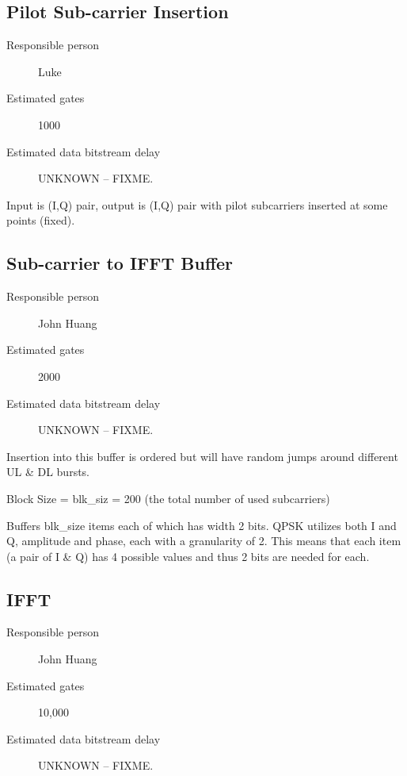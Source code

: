 \documentclass[dvips,10pt,twocolumn]{article}
\begin{document}
	
\subsection{Pilot Sub-carrier Insertion}
\label{sec:pilot}
\begin{description}
	\item[Responsible person] Luke
	\item[Estimated gates] 1000
	\item[Estimated data bitstream delay] UNKNOWN -- FIXME.
\end{description}

Input is (I,Q) pair, output is (I,Q) pair with pilot subcarriers
inserted at some points (fixed).


\subsection{Sub-carrier to IFFT Buffer}
\label{sec:ifft-buffer}
\begin{description}
	\item[Responsible person] John Huang
	\item[Estimated gates] 2000
	\item[Estimated data bitstream delay] UNKNOWN -- FIXME.
\end{description}
Insertion into this buffer is ordered but will have random
jumps around different UL \& DL bursts.

Block Size = blk\_siz = 200 (the total number of used
subcarriers)

Buffers blk\_size items each of which has width 2 bits.
QPSK utilizes both I and Q, amplitude and phase, each with
a granularity of 2. This means that each item (a pair of I
\& Q) has 4 possible values and thus 2 bits are needed for
each.

\subsection{IFFT}
\label{sec:ifft}
\begin{description}
	\item[Responsible person] John Huang
	\item[Estimated gates] 10,000
	\item[Estimated data bitstream delay] UNKNOWN -- FIXME.
\end{description}
\end{document}
